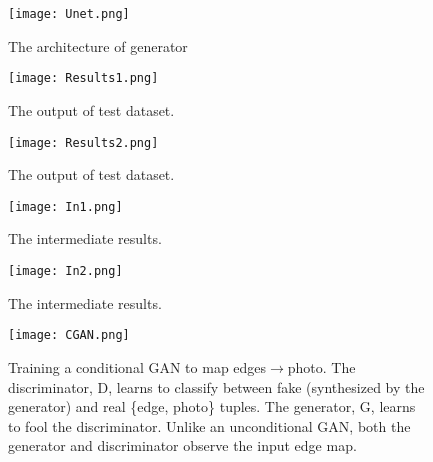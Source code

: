 \documentclass[a4paper]{article}
\begin{document}
\begin{figure}[!htp]
	\begin{center}
		\texttt{[image: Unet.png]}
	\end{center}
	\caption{The architecture of generator}
	\label{fig:Unet}
\end{figure}

\begin{figure}[!htp]
	\begin{center}
		\texttt{[image: Results1.png]}
	\end{center}
	\caption{The output of test dataset.}
	\label{fig:Results1}
\end{figure}

\begin{figure}[!htp]
	\begin{center}
		\texttt{[image: Results2.png]}
	\end{center}
	\caption{The output of test dataset.}
	\label{fig:Results2}
	\end{figure}
	
\begin{figure}[!htp]
	\begin{center}
		\texttt{[image: In1.png]}
	\end{center}
	\caption{The intermediate results.}
	\label{fig:In1}
\end{figure}

\begin{figure}[!htp]
	\begin{center}
		\texttt{[image: In2.png]}
	\end{center}
	\caption{The intermediate results.}
	\label{fig:In2}
\end{figure}

\begin{figure}[!htp]
	\begin{center}
		\texttt{[image: CGAN.png]}
	\end{center}
	\caption{Training a conditional GAN to map edges$\rightarrow$photo. The discriminator, D, learns to classify between fake (synthesized by the generator) and real \{edge, photo\} tuples. The generator, G, learns to fool the discriminator. Unlike an unconditional GAN, both the generator and discriminator observe the input edge map.}
	\label{fig:CGAN}
\end{figure}
\end{document}
